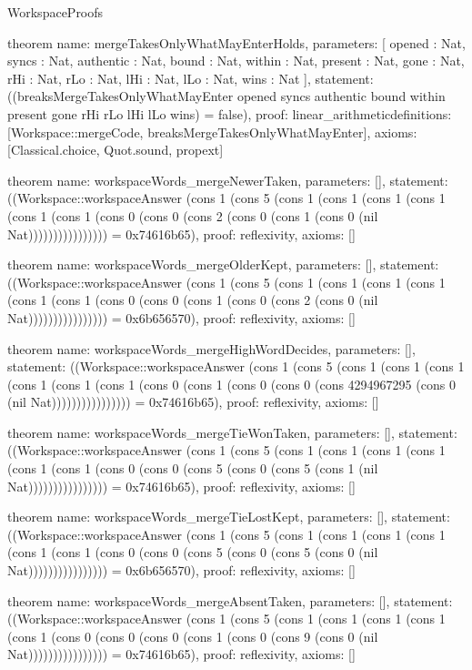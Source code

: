 \begin{lexlean}{WorkspaceProofs}
\begin{semanticmodule}
theorem{
  name: mergeTakesOnlyWhatMayEnterHolds,
  parameters: [
    opened : Nat,
    syncs : Nat,
    authentic : Nat,
    bound : Nat,
    within : Nat,
    present : Nat,
    gone : Nat,
    rHi : Nat,
    rLo : Nat,
    lHi : Nat,
    lLo : Nat,
    wins : Nat
  ],
  statement: ((breaksMergeTakesOnlyWhatMayEnter opened syncs authentic bound within present gone rHi rLo lHi lLo wins) = false),
  proof: linear_arithmetic{definitions: [Workspace::mergeCode, breaksMergeTakesOnlyWhatMayEnter]},
  axioms: [Classical.choice, Quot.sound, propext]
}

theorem{
  name: workspaceWords_mergeNewerTaken,
  parameters: [],
  statement: ((Workspace::workspaceAnswer (cons 1 (cons 5 (cons 1 (cons 1 (cons 1 (cons 1 (cons 1 (cons 1 (cons 0 (cons 0 (cons 2 (cons 0 (cons 1 (cons 0 (nil Nat)))))))))))))))) = 0x74616b65),
  proof: reflexivity{},
  axioms: []
}

theorem{
  name: workspaceWords_mergeOlderKept,
  parameters: [],
  statement: ((Workspace::workspaceAnswer (cons 1 (cons 5 (cons 1 (cons 1 (cons 1 (cons 1 (cons 1 (cons 1 (cons 0 (cons 0 (cons 1 (cons 0 (cons 2 (cons 0 (nil Nat)))))))))))))))) = 0x6b656570),
  proof: reflexivity{},
  axioms: []
}

theorem{
  name: workspaceWords_mergeHighWordDecides,
  parameters: [],
  statement: ((Workspace::workspaceAnswer (cons 1 (cons 5 (cons 1 (cons 1 (cons 1 (cons 1 (cons 1 (cons 1 (cons 0 (cons 1 (cons 0 (cons 0 (cons 4294967295 (cons 0 (nil Nat)))))))))))))))) = 0x74616b65),
  proof: reflexivity{},
  axioms: []
}

theorem{
  name: workspaceWords_mergeTieWonTaken,
  parameters: [],
  statement: ((Workspace::workspaceAnswer (cons 1 (cons 5 (cons 1 (cons 1 (cons 1 (cons 1 (cons 1 (cons 1 (cons 0 (cons 0 (cons 5 (cons 0 (cons 5 (cons 1 (nil Nat)))))))))))))))) = 0x74616b65),
  proof: reflexivity{},
  axioms: []
}

theorem{
  name: workspaceWords_mergeTieLostKept,
  parameters: [],
  statement: ((Workspace::workspaceAnswer (cons 1 (cons 5 (cons 1 (cons 1 (cons 1 (cons 1 (cons 1 (cons 1 (cons 0 (cons 0 (cons 5 (cons 0 (cons 5 (cons 0 (nil Nat)))))))))))))))) = 0x6b656570),
  proof: reflexivity{},
  axioms: []
}

theorem{
  name: workspaceWords_mergeAbsentTaken,
  parameters: [],
  statement: ((Workspace::workspaceAnswer (cons 1 (cons 5 (cons 1 (cons 1 (cons 1 (cons 1 (cons 1 (cons 0 (cons 0 (cons 0 (cons 1 (cons 0 (cons 9 (cons 0 (nil Nat)))))))))))))))) = 0x74616b65),
  proof: reflexivity{},
  axioms: []
}


\end{semanticmodule}
\end{lexlean}
